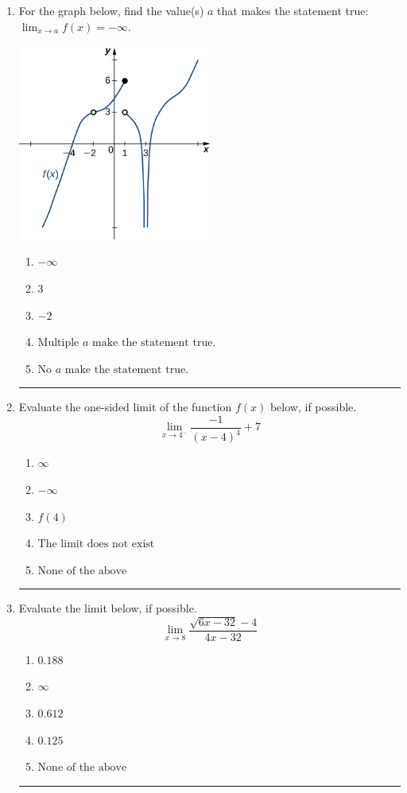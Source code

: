 \documentclass[14pt]{extbook}
\newcommand{\litem}[1]{\item#1\hspace*{-1cm}\rule{\textwidth}{0.4pt}}
\begin{document}
\begin{enumerate}
{\begin{enumerate}[label=\Alph*.]
\end{enumerate} }
\litem{
For the graph below, find the value(s) $a$ that makes the statement true: $ \displaystyle \lim_{x \rightarrow a} f(x) = -\infty$.
\begin{center}
    \includegraphics[width=0.5\textwidth]{../Figures/evaluateLimitGraphicallyCopyB.png}
\end{center}
\begin{enumerate}[label=\Alph*.]
\item \( -\infty \)
\item \( 3 \)
\item \( -2 \)
\item \( \text{Multiple } a \text{ make the statement true}. \)
\item \( \text{No } a \text{ make the statement true}. \)

\end{enumerate} }
\litem{
Evaluate the one-sided limit of the function $f(x)$ below, if possible.\[ \lim_{x \rightarrow 4^-} \frac{-1}{(x-4)^4}+7 \]\begin{enumerate}[label=\Alph*.]
\item \( \infty \)
\item \( -\infty \)
\item \( f(4) \)
\item \( \text{The limit does not exist} \)
\item \( \text{None of the above} \)

\end{enumerate} }
\litem{
Evaluate the limit below, if possible.\[ \lim_{x \rightarrow 8} \frac{\sqrt{6x - 32} - 4}{4x - 32} \]\begin{enumerate}[label=\Alph*.]
\item \( 0.188 \)
\item \( \infty \)
\item \( 0.612 \)
\item \( 0.125 \)
\item \( \text{None of the above} \)


\end{enumerate}}
\end{enumerate}
\end{document}

